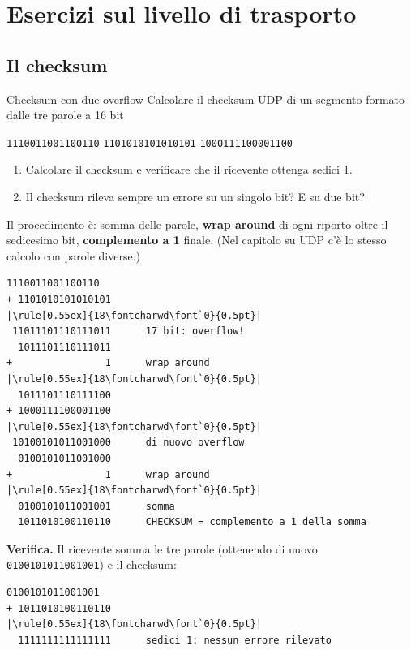 \chapter{Esercizi sul livello di trasporto}

\section{Il checksum}

\begin{esercizio}{Checksum con due overflow}
Calcolare il checksum UDP di un segmento formato dalle tre parole a 16 bit
\begin{center}
\texttt{1110011001100110} \qquad \texttt{1101010101010101} \qquad \texttt{1000111100001100}
\end{center}
\begin{enumerate}[label=(\alph*)]
    \item Calcolare il checksum e verificare che il ricevente ottenga sedici 1.
    \item Il checksum rileva sempre un errore su un singolo bit? E su due bit?
\end{enumerate}
\end{esercizio}

\svolgimento
Il procedimento è: somma delle parole, \textbf{wrap around} di ogni riporto oltre il sedicesimo bit, \textbf{complemento a 1}
finale. (Nel capitolo su UDP c'è lo stesso calcolo con parole diverse.)

\begin{lstlisting}[autogobble=false, escapechar=|]
  1110011001100110
+ 1101010101010101
|\rule[0.55ex]{18\fontcharwd\font`0}{0.5pt}|
 11011101110111011      17 bit: overflow!
  1011101110111011
+                1      wrap around
|\rule[0.55ex]{18\fontcharwd\font`0}{0.5pt}|
  1011101110111100
+ 1000111100001100
|\rule[0.55ex]{18\fontcharwd\font`0}{0.5pt}|
 10100101011001000      di nuovo overflow
  0100101011001000
+                1      wrap around
|\rule[0.55ex]{18\fontcharwd\font`0}{0.5pt}|
  0100101011001001      somma
  1011010100110110      CHECKSUM = complemento a 1 della somma
\end{lstlisting}

\textbf{Verifica.} Il ricevente somma le tre parole (ottenendo di nuovo \texttt{0100101011001001}) e il checksum:
\begin{lstlisting}[autogobble=false, escapechar=|]
  0100101011001001
+ 1011010100110110
|\rule[0.55ex]{18\fontcharwd\font`0}{0.5pt}|
  1111111111111111      sedici 1: nessun errore rilevato
\end{lstlisting}

